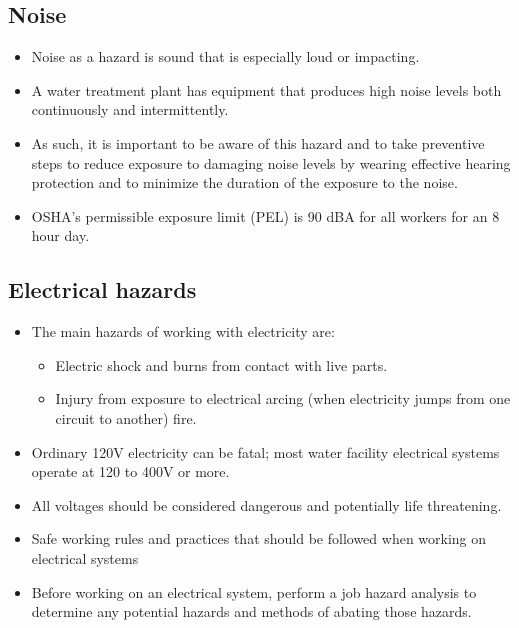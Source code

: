 \subsection{Noise}
\begin{itemize}
\item Noise as a hazard is sound that is especially loud or impacting. 
\item A water treatment plant has equipment that produces high noise levels both continuously and intermittently. 
\item As such, it is important to be aware of this hazard and to take preventive steps to reduce exposure to damaging noise levels by wearing effective hearing protection and to minimize the duration of the exposure to the noise.
\item OSHA's permissible exposure limit (PEL) is 90 dBA for all workers for an 8 hour day.
\end{itemize}

\subsection{Electrical hazards}
\begin{itemize}
\item The main hazards of working with electricity are: 
\begin{itemize}
\item Electric shock and burns from contact with live parts.
\item Injury from exposure to electrical arcing (when electricity jumps from one circuit to another) fire.
\end{itemize}
\item Ordinary 120V electricity can be fatal; most water facility electrical systems operate at 120 to 400V or more.  
\item All voltages should be considered dangerous and potentially life threatening.  
\item Safe working rules and practices that should be followed when working on electrical systems
\item Before working on an electrical system, perform a job hazard analysis to determine any potential hazards and methods of abating those hazards.
\end{itemize}

